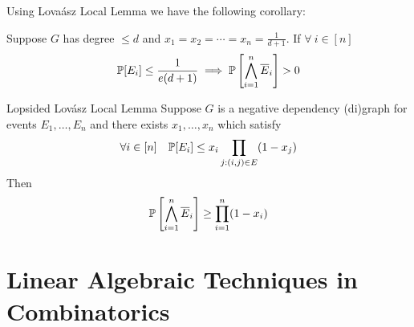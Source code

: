 \documentclass[twoside]{article}
\begin{document}
Using Lova\'{a}sz Local Lemma we have the following corollary:
\begin{corolary}{}{}
	Suppose $G$ has degree $\leq d$ and $x_1=x_2=\cdots=x_n=\frac1{d+1}$. If $\forall\ i\in[n]$ $$\mathbb{P}[E_i]\leq\frac{1}{e(d+1)}\implies \mathbb{P}\left[\bigwedge_{i=1}^n\overline{E}_i\right]>0$$
\end{corolary}
\begin{Theorem}{Lopsided Lov\'{a}sz Local Lemma}{}
	Suppose $G$ is a negative dependency (di)graph for events $E_1,\dots, E_n$ and there exists $x_1,\dots, x_n$ which satisfy $$\forall i\in[n]\quad \mathbb{P}[E_i]\leq x_i\prod_{j:(i,j)\in E}(1-x_j)$$Then $$\mathbb{P}\left[\bigwedge_{i=1}^n\overline{E}_i\right]\geq \prod_{i=1}^n(1-x_i)$$
\end{Theorem}

\section{Linear Algebraic Techniques in Combinatorics}
\end{document}
